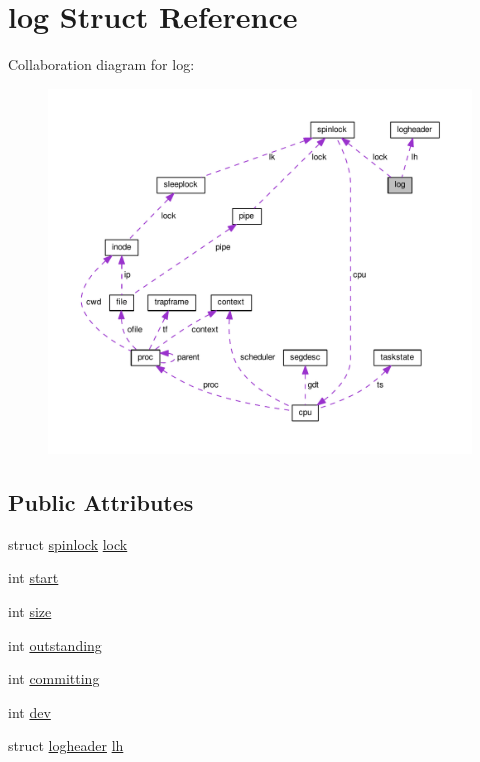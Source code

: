 \hypertarget{structlog}{}\section{log Struct Reference}
\label{structlog}


Collaboration diagram for log\+:\nopagebreak
\begin{figure}[H]
\begin{center}
\leavevmode
\includegraphics[width=350pt]{d4/d63/structlog__coll__graph}
\end{center}
\end{figure}
\subsection*{Public Attributes}
\begin{DoxyCompactItemize}
\item 
struct \hyperlink{structspinlock}{spinlock} \hyperlink{structlog_a980a1d1aa9c60af7a82f297f8ab54d2e}{lock}
\item 
int \hyperlink{structlog_a28d847dd722497fa3497b14f68267618}{start}
\item 
int \hyperlink{structlog_a2257e716d4b77efd0524286cf5772a41}{size}
\item 
int \hyperlink{structlog_addfc1fc09a124978bd7e2a23a19d733d}{outstanding}
\item 
int \hyperlink{structlog_afc034b98b98897c179ca8fae8e2ee181}{committing}
\item 
int \hyperlink{structlog_aebeeb9df7326549fb5d8b7221c9b0aa3}{dev}
\item 
struct \hyperlink{structlogheader}{logheader} \hyperlink{structlog_a7808516ed2f708dcb13912b1e8fc20d9}{lh}
\end{DoxyCompactItemize}



